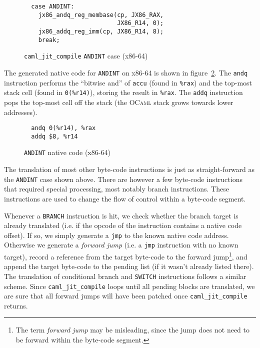 \documentclass[10pt,a4paper,twocolumn]{article}
\begin{document}
\begin{figure}[ht]
  \centering
  \begin{verbatim}
  case ANDINT:
    jx86_andq_reg_membase(cp, JX86_RAX,
                          JX86_R14, 0);
    jx86_addq_reg_imm(cp, JX86_R14, 8);
    break;
\end{verbatim}
  \caption{\texttt{caml\_jit\_compile} \texttt{ANDINT} case (x86-64)}
  \label{figure:caml_jit_compile_ANDINT}
\end{figure}

The generated native code for \texttt{ANDINT} on x86-64 is shown in figure~\ref{figure:ANDINT_native_code}.
The \texttt{andq} instruction performs the ``bitwise and'' of \texttt{accu} (found in \texttt{\%rax}) and
the top-most stack cell (found in \texttt{0(\%r14)}), storing the result in \texttt{\%rax}. The \texttt{addq}
instruction pops the top-most cell off the stack (the \textsc{OCaml} stack grows towards lower addresses).

\begin{figure}[ht]
  \centering
  \begin{verbatim}
  andq 0(%r14), %rax
  addq $8, %r14
\end{verbatim}
  \caption{\texttt{ANDINT} native code (x86-64)}
  \label{figure:ANDINT_native_code}
\end{figure}

The translation of most other byte-code instructions is just as straight-forward as
the \texttt{ANDINT} case shown above. There are however a few byte-code instructions that
required special processing, most notably branch instructions. These instructions are used
to change the flow of control within a byte-code segment.

Whenever a \texttt{BRANCH} instruction is hit, we check whether the branch target is already
translated (i.e. if the opcode of the instruction contains a native code offset). If so, we
simply generate a \texttt{jmp} to the known native code address.
Otherwise we generate a \emph{forward jump} (i.e. a \texttt{jmp} instruction with no known
target), record a reference from the target byte-code to the forward jump\footnote{The
term \emph{forward jump} may be misleading, since the jump does not need to be forward
within the byte-code segment.}, and append the target byte-code to the pending list
(if it wasn't already listed there). The translation of conditional branch and \texttt{SWITCH}
instructions follows a similar scheme. Since \texttt{caml\_jit\_compile}
loops until all pending blocks are translated, we are sure that all forward jumps will
have been patched once \texttt{caml\_jit\_compile} returns.
\end{document}
